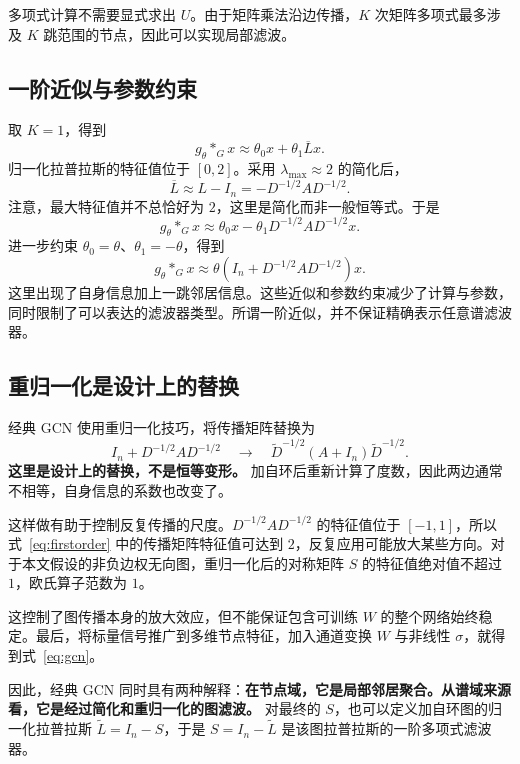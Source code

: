 \documentclass[UTF8,a4paper,11pt,fontset=fandol]{ctexart}
\begin{document}
多项式计算不需要显式求出 $U$。由于矩阵乘法沿边传播，$K$ 次矩阵多项式最多涉及 $K$ 跳范围的节点，因此可以实现局部滤波。

\subsection{一阶近似与参数约束}
取 $K=1$，得到
\begin{equation}
g_\theta *_G x\approx\theta_0x+\theta_1\overline Lx.
\end{equation}
归一化拉普拉斯的特征值位于 $[0,2]$。采用 $\lambda_{\max}\approx2$ 的简化后，
\begin{equation}
\overline L\approx L-I_n=-D^{-1/2}AD^{-1/2}.
\end{equation}
注意，最大特征值并不总恰好为 $2$，这里是简化而非一般恒等式。于是
\begin{equation}
g_\theta *_G x\approx
\theta_0x-\theta_1D^{-1/2}AD^{-1/2}x.
\end{equation}
进一步约束 $\theta_0=\theta$、$\theta_1=-\theta$，得到
\begin{equation}
g_\theta *_G x\approx
\theta\left(I_n+D^{-1/2}AD^{-1/2}\right)x.
\label{eq:firstorder}
\end{equation}
这里出现了自身信息加上一跳邻居信息。这些近似和参数约束减少了计算与参数，同时限制了可以表达的滤波器类型。所谓一阶近似，并不保证精确表示任意谱滤波器。

\subsection{重归一化是设计上的替换}
经典 GCN 使用重归一化技巧，将传播矩阵替换为
\begin{equation}
I_n+D^{-1/2}AD^{-1/2}
\quad\longrightarrow\quad
\widetilde D^{-1/2}(A+I_n)\widetilde D^{-1/2}.
\end{equation}
\textbf{这里是设计上的替换，不是恒等变形。} 加自环后重新计算了度数，因此两边通常不相等，自身信息的系数也改变了。

这样做有助于控制反复传播的尺度。$D^{-1/2}AD^{-1/2}$ 的特征值位于 $[-1,1]$，所以式~\eqref{eq:firstorder} 中的传播矩阵特征值可达到 $2$，反复应用可能放大某些方向。对于本文假设的非负边权无向图，重归一化后的对称矩阵 $S$ 的特征值绝对值不超过 $1$，欧氏算子范数为 $1$。

这控制了图传播本身的放大效应，但不能保证包含可训练 $W$ 的整个网络始终稳定。最后，将标量信号推广到多维节点特征，加入通道变换 $W$ 与非线性 $\sigma$，就得到式~\eqref{eq:gcn}。

因此，经典 GCN 同时具有两种解释：\textbf{在节点域，它是局部邻居聚合。从谱域来源看，它是经过简化和重归一化的图滤波。} 对最终的 $S$，也可以定义加自环图的归一化拉普拉斯 $\widetilde L=I_n-S$，于是 $S=I_n-\widetilde L$ 是该图拉普拉斯的一阶多项式滤波器。
\end{document}
